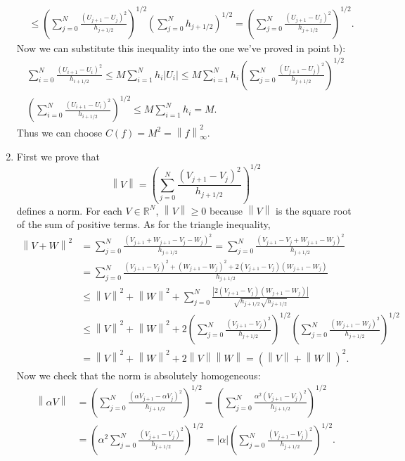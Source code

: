 \documentclass[a4paper]{article}
\newcommand{\abs}[1]{\left\lvert #1 \right\rvert}
\newcommand{\norm}[1]{\left\lVert #1 \right\rVert}
\newcommand{\R}{\mathbb{R}}
\begin{document}
\begin{enumerate}[label=\textbf{\alph*)},leftmargin=*]
\begin{align*}
&	\leq \left(\sum_{j=0}^{N} \frac{(U_{j+1}-U_j)^2}{h_{j+1/2}}\right)^{1/2}
	     \left( \sum_{j=0}^{N} h_{j+1/2} \right)^{1/2}
	= \left(\sum_{j=0}^{N} \frac{(U_{j+1}-U_j)^2}{h_{j+1/2}}\right)^{1/2}.
	\end{align*}
	Now we can substitute this inequality into the one we've proved in point b):
	\begin{gather*}
	\sum^N_{i=0} \frac{(U_{i+1}-U_i)^2}{h_{i+1/2}}
	\leq M \sum_{i=1}^N h_i \abs{U_i}
	\leq M \sum_{i=1}^N h_i \left(
		\sum_{j=0}^{N} \frac{(U_{j+1}-U_j)^2}{h_{j+1/2}}\right)^{1/2} \\
	\left( \sum^N_{i=0} \frac{(U_{i+1}-U_i)^2}{h_{i+1/2}} \right)^{1/2}
	\leq M \sum_{i=1}^N h_i
	= M.
	\end{gather*}
	Thus we can choose $C(f) = M^2 = \norm{f}_\infty^2$.
\item First we prove that
	\[
	\norm{V} = \left( \sum_{j=0}^N \frac{(V_{j+1}-V_j)^2}{h_{j+1/2}} \right)^{1/2}
	\]
	defines a norm. For each $V \in \R^N$, $\norm{V} \geq 0$ because $\norm{V}$
	is the square root of the sum of positive terms. As for the triangle inequality,
	\begin{align*}
	\norm{V+W}^2
&	= \sum_{j=0}^N \frac{(V_{j+1}+W_{j+1}-V_j-W_j)^2}{h_{j+1/2}}
	= \sum_{j=0}^N \frac{(V_{j+1}-V_j+W_{j+1}-W_j)^2}{h_{j+1/2}} \\
&	= \sum_{j=0}^N \frac{(V_{j+1}-V_j)^2 + (W_{j+1}-W_j)^2
	                                     + 2(V_{j+1}-V_j)(W_{j+1}-W_j)}{h_{j+1/2}} \\
&	\leq \norm{V}^2 + \norm{W}^2 + \sum_{j=0}^N \frac{|2(V_{j+1}-V_j)(W_{j+1}-W_j)|}
		{\sqrt{h_{j+1/2}} \sqrt{h_{j+1/2}}} \\
&	\leq \norm{V}^2 + \norm{W}^2
	+ 2\left(\sum^N_{j=0}\frac{(V_{j+1}-V_j)^2}{h_{j+1/2}}\right)^{1/2}
	   \left(\sum^N_{j=0}\frac{(W_{j+1}-W_j)^2}{h_{j+1/2}}\right)^{1/2} \\
&	= \norm{V}^2 + \norm{W}^2 + 2 \norm{V} \norm{W}
	= (\norm{V} + \norm{W})^2.
	\end{align*}
	Now we check that the norm is absolutely homogeneous:
	\begin{align*}
	\norm{\alpha V}
&	= \left( \sum_{j=0}^N \frac{(\alpha V_{j+1} - \alpha V_j)^2}{h_{j+1/2}} \right)^{1/2}
	= \left( \sum_{j=0}^N \frac{\alpha^2 (V_{j+1} - V_j)^2}{h_{j+1/2}} \right)^{1/2} \\
&	= \left( \alpha^2 \sum_{j=0}^N \frac{(V_{j+1} - V_j)^2}{h_{j+1/2}} \right)^{1/2}
	= \abs{\alpha} \left( \sum_{j=0}^N \frac{(V_{j+1} - V_j)^2}{h_{j+1/2}} \right)^{1/2}.
	\end{align*}

\end{enumerate}
\end{document}
